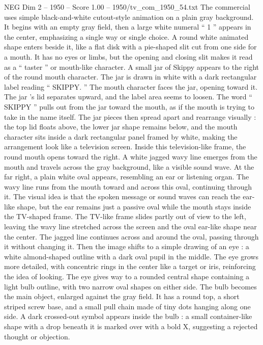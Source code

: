 \begin{textsample}{NEG Dim 2 – 1950 – Score 1.00 – 1950/tv\_com\_1950\_54.txt}  \label{ex:f2_neg_011}
The commercial uses simple black-and-white cutout-style animation on a plain gray background.
It begins with an empty gray field, then a large white numeral “ 1 ” appears in the center, emphasizing a single way or single choice.
A round white animated shape enters beside it, like a flat disk with a pie-shaped slit cut from one side for a mouth.
It has no eyes or limbs, but the opening and closing slit makes it read as a “ taster ” or mouth-like character.
A small jar of Skippy appears to the right of the round mouth character.
The jar is drawn in white with a dark rectangular label reading “ SKIPPY. ” The mouth character faces the jar, opening toward it.
The jar ’s lid separates upward, and the label area seems to loosen.
The word “ SKIPPY ” pulls out from the jar toward the mouth, as if the mouth is trying to take in the name itself.
The jar pieces then spread apart and rearrange visually : the top lid floats above, the lower jar shape remains below, and the mouth character sits inside a dark rectangular panel framed by white, making the arrangement look like a television screen.
Inside this television-like frame, the round mouth opens toward the right.
A white jagged wavy line emerges from the mouth and travels across the gray background, like a visible sound wave.
At the far right, a plain white oval appears, resembling an ear or listening organ.
The wavy line runs from the mouth toward and across this oval, continuing through it.
The visual idea is that the spoken message or sound waves can reach the ear-like shape, but the ear remains just a passive oval while the mouth stays inside the TV-shaped frame.
The TV-like frame slides partly out of view to the left, leaving the wavy line stretched across the screen and the oval ear-like shape near the center.
The jagged line continues across and around the oval, passing through it without changing it.
Then the image shifts to a simple drawing of an eye : a white almond-shaped outline with a dark oval pupil in the middle.
The eye grows more detailed, with concentric rings in the center like a target or iris, reinforcing the idea of looking.
The eye gives way to a rounded central shape containing a light bulb outline, with two narrow oval shapes on either side.
The bulb becomes the main object, enlarged against the gray field.
It has a round top, a short striped screw base, and a small pull chain made of tiny dots hanging along one side.
A dark crossed-out symbol appears inside the bulb : a small container-like shape with a drop beneath it is marked over with a bold X, suggesting a rejected thought or objection.

\end{textsample}
